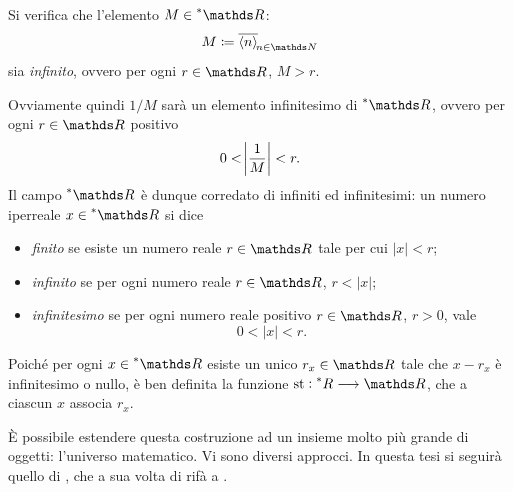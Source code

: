 Si verifica che l'elemento $ M \in \starR $: \begin{equation*}
    M \coloneqq \filtersequence{n}
\end{equation*}sia \emph{infinito}, ovvero per ogni $ r \in \R $, $ M > r $. 

Ovviamente quindi $ 1/M $ sarà un elemento infinitesimo di $ \starR $, ovvero per ogni $ r \in \R$ positivo \begin{equation*}
    0 < \abs{\frac{1}{M}} <r.
\end{equation*}Il campo $ \starR $ è dunque corredato di infiniti ed infinitesimi: un numero iperreale $ x \in \starR $ si dice \begin{itemize}
    \item \emph{finito} se esiste un numero reale $ r \in \R $ tale per cui $ |x|<r $;
    \item \emph{infinito} se per ogni numero reale $ r \in \R$, $ r<|x| $;
    \item \emph{infinitesimo} se per ogni numero reale positivo $ r \in \R $, $ r>0 $, vale \begin{equation*}
        0 < |x| < r.
    \end{equation*}
\end{itemize}
Poiché per ogni $ x \in \starR $ esiste un unico $ r_{x}  \in \R $ tale che $ x-r_{x}  $ è infinitesimo o nullo, è ben definita la funzione $ \st: \nonstandard{R} \longrightarrow \R $, che a ciascun $ x $ associa $ r_{x}  $.

È possibile estendere questa costruzione ad un insieme molto più grande di oggetti: l'universo matematico. Vi sono diversi approcci. In questa tesi si seguirà quello di \cite{nowik_differential_2015}, che a sua volta di rifà a \cite{chang_model_2012}.

